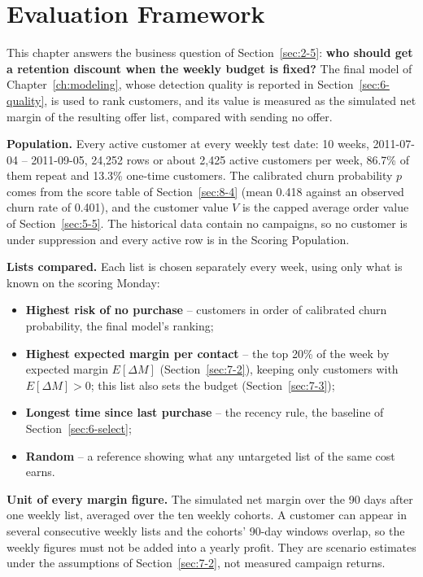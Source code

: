 \section{Evaluation Framework}
\label{sec:7-1}

This chapter answers the business question of Section~\ref{sec:2-5}: \textbf{who should get a retention discount when the weekly budget is fixed?} The final model of Chapter~\ref{ch:modeling}, whose detection quality is reported in Section~\ref{sec:6-quality}, is used to rank customers, and its value is measured as the simulated net margin of the resulting offer list, compared with sending no offer.

\textbf{Population.} Every active customer at every weekly test date: 10 weeks, 2011-07-04 -- 2011-09-05, 24,252 rows or about 2,425 active customers per week, 86.7\% of them repeat and 13.3\% one-time customers. The calibrated churn probability $p$ comes from the score table of Section~\ref{sec:8-4} (mean 0.418 against an observed churn rate of 0.401), and the customer value $V$ is the capped average order value of Section~\ref{sec:5-5}. The historical data contain no campaigns, so no customer is under suppression and every active row is in the Scoring Population.

\textbf{Lists compared.} Each list is chosen separately every week, using only what is known on the scoring Monday:
\begin{itemize}
    \item \textbf{Highest risk of no purchase} -- customers in order of calibrated churn probability, the final model's ranking;
    \item \textbf{Highest expected margin per contact} -- the top 20\% of the week by expected margin $E[\Delta M]$ (Section~\ref{sec:7-2}), keeping only customers with $E[\Delta M] > 0$; this list also sets the budget (Section~\ref{sec:7-3});
    \item \textbf{Longest time since last purchase} -- the recency rule, the baseline of Section~\ref{sec:6-select};
    \item \textbf{Random} -- a reference showing what any untargeted list of the same cost earns.
\end{itemize}

\textbf{Unit of every margin figure.} The simulated net margin over the 90 days after one weekly list, averaged over the ten weekly cohorts. A customer can appear in several consecutive weekly lists and the cohorts' 90-day windows overlap, so the weekly figures must not be added into a yearly profit. They are scenario estimates under the assumptions of Section~\ref{sec:7-2}, not measured campaign returns.

